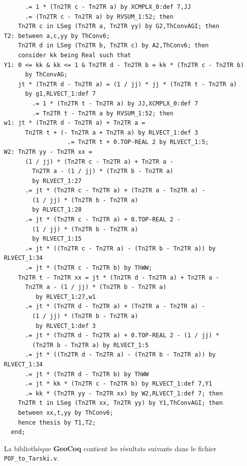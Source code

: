 \documentclass[8pt,a4paper]{article}
\theoremstyle{plain}
\begin{document}
\begin{verbatim}
      .= 1 * (Tn2TR c - Tn2TR a) by XCMPLX_0:def 7,JJ
      .= (Tn2TR c - Tn2TR a) by RVSUM_1:52; then
    Tn2TR c in LSeg (Tn2TR a, Tn2TR yy) by G2,ThConvAGI; then
T2: between a,c,yy by ThConv6;
    Tn2TR d in LSeg (Tn2TR b, Tn2TR c) by A2,ThConv6; then
    consider kk being Real such that
Y1: 0 <= kk & kk <= 1 & Tn2TR d - Tn2TR b = kk * (Tn2TR c - Tn2TR b)
      by ThConvAG;
    jt * (Tn2TR d - Tn2TR a) = (1 / jj) * jj * (Tn2TR t - Tn2TR a)
      by g1,RLVECT_1:def 7
        .= 1 * (Tn2TR t - Tn2TR a) by JJ,XCMPLX_0:def 7
        .= Tn2TR t - Tn2TR a by RVSUM_1:52; then
w1: jt * (Tn2TR d - Tn2TR a) + Tn2TR a =
      Tn2TR t + (- Tn2TR a + Tn2TR a) by RLVECT_1:def 3
                  .= Tn2TR t + 0.TOP-REAL 2 by RLVECT_1:5;
W2: Tn2TR yy - Tn2TR xx =
      (1 / jj) * (Tn2TR c - Tn2TR a) + Tn2TR a -
        Tn2TR a - (1 / jj) * (Tn2TR b - Tn2TR a)
        by RLVECT_1:27
      .= jt * (Tn2TR c - Tn2TR a) + (Tn2TR a - Tn2TR a) -
        (1 / jj) * (Tn2TR b - Tn2TR a)
        by RLVECT_1:28
      .= jt * (Tn2TR c - Tn2TR a) + 0.TOP-REAL 2 -
        (1 / jj) * (Tn2TR b - Tn2TR a)
        by RLVECT_1:15
      .= jt * ((Tn2TR c - Tn2TR a) - (Tn2TR b - Tn2TR a)) by RLVECT_1:34
      .= jt * (Tn2TR c - Tn2TR b) by ThWW;
    Tn2TR t - Tn2TR xx = jt * (Tn2TR d - Tn2TR a) + Tn2TR a -
      Tn2TR a - (1 / jj) * (Tn2TR b - Tn2TR a)
         by RLVECT_1:27,w1
      .= jt * (Tn2TR d - Tn2TR a) + (Tn2TR a - Tn2TR a) -
        (1 / jj) * (Tn2TR b - Tn2TR a)
         by RLVECT_1:def 3
      .= jt * (Tn2TR d - Tn2TR a) + 0.TOP-REAL 2 - (1 / jj) *
        (Tn2TR b - Tn2TR a) by RLVECT_1:5
      .= jt * ((Tn2TR d - Tn2TR a) - (Tn2TR b - Tn2TR a)) by RLVECT_1:34
      .= jt * (Tn2TR d - Tn2TR b) by ThWW
      .= jt * kk * (Tn2TR c - Tn2TR b) by RLVECT_1:def 7,Y1
      .= kk * (Tn2TR yy - Tn2TR xx) by W2,RLVECT_1:def 7; then
    Tn2TR t in LSeg (Tn2TR xx, Tn2TR yy) by Y1,ThConvAGI; then
    between xx,t,yy by ThConv6;
    hence thesis by T1,T2;
  end;
\end{verbatim}

La bibliothèque \textbf{GeoCoq} contient les résultats suivants dans le fichier \verb+POF_to_Tarski.v+.

\end{document}
